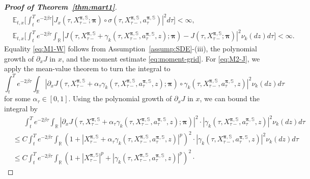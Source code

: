 \documentclass[11pt]{article}
\newcommand{\1}{\mathbbm{1}}
\begin{document}
\begin{proof}[\bf Proof of Theorem~\ref{thm:mart1}]
{\begin{align}
		& \mathbb{E}_{t,x}  \bigg[ \int_t^T  e^{-2\beta \tau}  |  J_x(\tau,  X_{\tau-}^{\boldsymbol{\pi}, \mathbb{S}};   \boldsymbol{\pi} )\circ{\sigma}(\tau,  X^{\boldsymbol{\pi}, \mathbb{S} }_{\tau-}, a^{\boldsymbol{\pi}, \mathbb{S} }_\tau ) |^2 d\tau \bigg] < \infty, \label{eq:M1-W} \\
		& \mathbb{E}_{t,x} \bigg[ \int_t^T  e^{-2\beta \tau}  \int_{\mathbb{R}} | J (\tau, X^{\boldsymbol{\pi}, \mathbb{S}}_{\tau-} + {\gamma}_k( \tau, X^{\boldsymbol{\pi}, \mathbb{S}}_{\tau-} , a_\tau^{\boldsymbol{\pi}, \mathbb{S}}, z) ;   \boldsymbol{\pi}) -  J(\tau, X^{\boldsymbol{\pi}, \mathbb{S}}_{\tau-}; \boldsymbol{\pi})|^2 \nu_k(dz) d\tau \bigg] < \infty. \label{eq:M2-J}
	\end{align}
Equality \eqref{eq:M1-W} follows from Assumption~\ref{assump:SDE}-(iii), the polynomial growth of $\partial_xJ$ in $x$, and the moment estimate \eqref{eq:moment-grid}. For \eqref{eq:M2-J}, we apply the mean-value theorem to turn  the integral to
\begin{equation}
	\int_t^T  e^{-2\beta \tau}  \int_{\mathbb{R}} | \partial_xJ(\tau, X^{\boldsymbol{\pi}, \mathbb{S}}_{\tau-} + \alpha_{\tau}{\gamma}_k( \tau, X^{\boldsymbol{\pi}, \mathbb{S}}_{\tau-} , a_\tau^{\boldsymbol{\pi}, \mathbb{S}}, z) ;   \boldsymbol{\pi})\circ
	{\gamma}_k( \tau, X^{\boldsymbol{\pi}, \mathbb{S}}_{\tau-} , a_\tau^{\boldsymbol{\pi}, \mathbb{S}}, z)|^2 \nu_k(dz) d\tau
\end{equation}
for some $\alpha_{\tau}\in[0,1]$. Using the polynomial growth of $\partial_xJ$ in $x$, we can bound the integral by
\begin{align}
	&\phantom{\leq~}\int_t^T  e^{-2\beta \tau}  \int_{\mathbb{R}} |\partial_xJ(\tau, X^{\boldsymbol{\pi}, \mathbb{S}}_{\tau-} + \alpha_{\tau}{\gamma}_k( \tau, X^{\boldsymbol{\pi}, \mathbb{S}}_{\tau-} , a_\tau^{\boldsymbol{\pi}, \mathbb{S}}, z) ;   \boldsymbol{\pi})|^2\cdot
	|{\gamma}_k( \tau, X^{\boldsymbol{\pi}, \mathbb{S}}_{\tau-} , a_\tau^{\boldsymbol{\pi}, \mathbb{S}}, z)|^2 \nu_k(dz) d\tau\\
	&\leq C\int_t^T  e^{-2\beta \tau}  \int_{\mathbb{R}} (1+ |X^{\boldsymbol{\pi}, \mathbb{S}}_{\tau-} + \alpha_{\tau}{\gamma}_k( \tau, X^{\boldsymbol{\pi}, \mathbb{S}}_{\tau-} , a_\tau^{\boldsymbol{\pi}, \mathbb{S}}, z)|^p)^2\cdot
	|{\gamma}_k( \tau, X^{\boldsymbol{\pi}, \mathbb{S}}_{\tau-} , a_\tau^{\boldsymbol{\pi}, \mathbb{S}}, z)|^2 \nu_k(dz) d\tau\\
	&\leq C\int_t^T  e^{-2\beta \tau}  \int_{\mathbb{R}} (1+ |X^{\boldsymbol{\pi}, \mathbb{S}}_{\tau-}|^p + |{\gamma}_k( \tau, X^{\boldsymbol{\pi}, \mathbb{S}}_{\tau-} , a_\tau^{\boldsymbol{\pi}, \mathbb{S}}, z)|^p)^2\cdot

\end{align}}
\end{proof}
\end{document}
